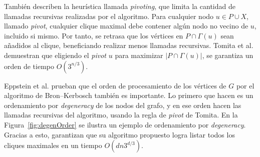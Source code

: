 También describen la heurística llamada \textit{pivoting}, que limita la cantidad de llamadas recursivas realizadas por el algoritmo. Para cualquier nodo $u \in P \cup X$, llamado \textit{pivot}, cualquier clique maximal debe contener algún nodo no vecino de $u$, incluido si mismo. Por tanto, se retrasa que los vértices en $P \cap \Gamma(u)$ sean añadidos al clique, beneficiando realizar menos llamadas recursivas. Tomita et al. \cite{tomita2006worst} demuestran que eligiendo el \textit{pivot} $u$ para maximizar $|P \cap \Gamma(u)|$, se garantiza un orden de tiempo $O(3^{n/3})$.

Eppstein et al. \cite{eppstein2010listing} prueban que el orden de procesamiento de los vértices de $G$ por el algoritmo de Bron–Kerbosch también es importante. Lo primero que hacen es un ordenamiento por \textit{degeneracy} de los nodos del grafo, y en ese orden hacen las llamadas recursivas del algoritmo, usando la regla de \textit{pivot} de Tomita. En la Figura~\ref{fig:degenOrder} se ilustra un ejemplo de ordenamiento por \textit{degeneracy}. Gracias a esto, garantizan que su algoritmo propuesto logra listar todos los cliques maximales en un tiempo $O(dn3^{d/3})$.



